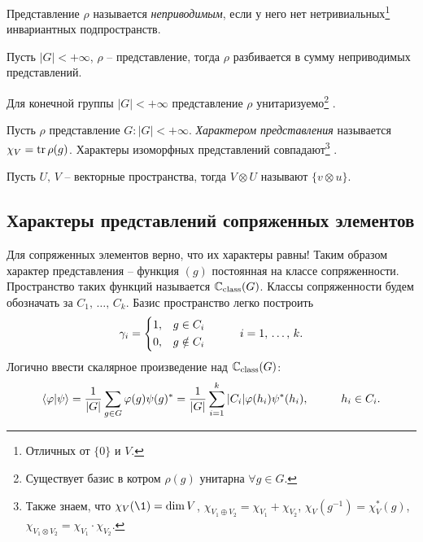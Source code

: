 \begin{to_def}
    Представление $\rho$ называется \textit{неприводимым}, если у него нет нетривиальных\footnote{
    	Отличных от $\{0\}$ и $V$. 
    } инвариантных подпространств.
\end{to_def}


\begin{to_thr}
    Пусть $|G| < + \infty$, $\rho$ -- представление, тогда $\rho$ разбивается в сумму неприводимых представлений.
\end{to_thr}

\begin{to_lem}
    Для конечной группы $|G| < + \infty$ представление $\rho$ унитаризуемо\footnote{
    	Существует базис в котром $\rho(g)$ унитарна $\forall  g \in G$. 
    } . 
\end{to_lem}



\begin{to_def}
    Пусть $\rho$ представление $G \colon |G| < +\infty$. \textit{Характером представления} называется $\chi_V = \mathop{\mathrm{tr}}\nolimits \rho(g)$. 
    Характеры изоморфных представлений совпадают\footnote{
		Также знаем, что $\chi_V(\1) = \dim V$, $\chi_{V_1 \oplus V_2} = \chi_{V_1} + \chi_{V_2}$, $\chi_V (g^{-1}) = \chi_V^* (g)$,
		$\chi_{V_1 \otimes V_2} = \chi_{V_1} \cdot \chi_{V_2}$.
    } . 
\end{to_def}



\begin{to_def}
    Пусть $U,\, V$ -- векторные пространства, тогда $V \otimes U$ называют $\{v \otimes u \}$. 
\end{to_def}


\subsection*{Характеры представлений сопряженных элементов}

Для сопряженных элементов верно, что их характеры равны! Таким образом характер представления -- функция $(g)$ постоянная на классе сопряженности. Пространство таких функций называется $\mathbb{C}_{\textnormal{class}} (G)$. Классы сопряженности будем обозначать за $C_1,\, \ldots,\, C_k$.  Базис пространство легко построить
\begin{equation*}
	\gamma_i = \left\{\begin{aligned}
	    &1, &g \in C_i \\
	    &0, &g \notin C_i
	\end{aligned}\right.
	\hspace{10 mm} 
	i = 1,\, \ldots,\, k.
\end{equation*}
Логично ввести скалярное произведение над $\mathbb{C}_{\textnormal{class}} (G)$:
\begin{equation*}
	\bk{\varphi}{\psi} = \frac{1}{|G|} \sum_{g \in G} \varphi(g) \psi(g)^* = \frac{1}{|G|} \sum_{i=1}^{k} |C_i| \varphi(h_i) \psi^* (h_i),
	\hspace{10 mm} 
	h_i \in C_i.
\end{equation*}



